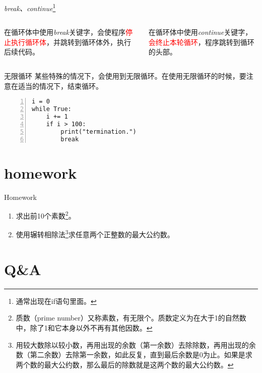 \documentclass{beamer}
\begin{document}
\begin{frame}{\textit{break、continue}\footnote{通常出现在if语句里面。}}
\begin{columns}

在循环体中使用\textit{break}关键字，会使程序\textcolor{red}{停止执行循环体}，并跳转到循环体外，执行后续代码。

在循环体中使用\textit{continue}关键字，\textcolor{red}{会终止本轮循环}，程序跳转到循环的头部。
\end{columns}
\end{frame}
\begin{frame}[fragile]{无限循环}
某些特殊的情况下，会使用到无限循环。在使用无限循环的时候，要注意在适当的情况下，结束循环。
\begin{Verbatim}[numbers=left,frame=single,rulecolor=\color{red}]
i = 0
while True:
    i += 1
    if i > 100:
        print("termination.")
        break
\end{Verbatim}
\end{frame}

\section{homework}
\begin{frame}{Homework}
\begin{enumerate}
\item
求出前10个素数\footnote{质数（prime number）又称素数，有无限个。质数定义为在大于1的自然数中，除了1和它本身以外不再有其他因数。}。
\item
使用辗转相除法\footnote{用较大数除以较小数，再用出现的余数（第一余数）去除除数，再用出现的余数（第二余数）去除第一余数，如此反复，直到最后余数是0为止。如果是求两个数的最大公约数，那么最后的除数就是这两个数的最大公约数。}求任意两个正整数的最大公约数。
\end{enumerate}
\end{frame}
\section{Q\&A}
\begin{frame}
\end{frame}


%
\end{document}
